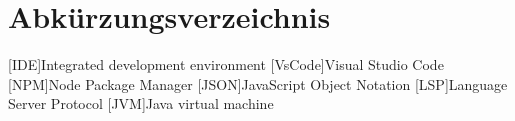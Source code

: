 \chapter*{Abkürzungsverzeichnis}

\begin{acronym}[LoRaWAN]

[IDE]{Integrated development environment}
[VsCode]{Visual Studio Code}
[NPM]{Node Package Manager}
[JSON]{JavaScript Object Notation}
[LSP]{Language Server Protocol}
[JVM]{Java virtual machine}


\end{acronym}
